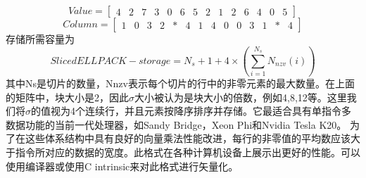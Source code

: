 \documentclass[forprint]{WHUBachelor}
\begin{document}
\begin{equation} 
Value=\left[ \begin{array}{cccccccccccccc}{4} & {2} & {7} & {3} & {0} & {6} & {5} & {2} & {1} & {2} & {6} & {4} & {0} & {5}\end{array}\right]
 \end{equation}
\begin{equation} 
Column=\left[ \begin{array}{cccccccccccccc}{1} & {0} & {3} & {2} & {*} & {4} & {1} & {4} & {0} & {0} & {3} & {1} & {*} & {4}\end{array}\right]
 \end{equation}
存储所需容量为
\begin{equation} 
SlicedELLPACK-storage=N_{s}+1+4 \times\left(\sum_{i=1}^{N_{s}} N_{n z v}(i)\right)
 \end{equation}
其中Ns是切片的数量，Nnzv表示每个切片的行中的非零元素的最大数量。在上面的矩阵中，块大小是2，因此$\sigma$大小被认为是块大小的倍数，例如4,8,12等。这里我们将$\sigma$的值视为4个连续行，并且元素按降序排序并存储。它最适合具有单指令多数据功能的当前一代处理器，如Sandy Bridge，Xeon Phi和Nvidia Tesla K20。 为了在这些体系结构中具有良好的向量乘法性能改进，每行的非零值的平均数应该大于指令所对应的数据的宽度。此格式在各种计算机设备上展示出更好的性能。可以使用编译器或使用C intrinsic来对此格式进行矢量化。


\cleardoublepage
\end{document}
